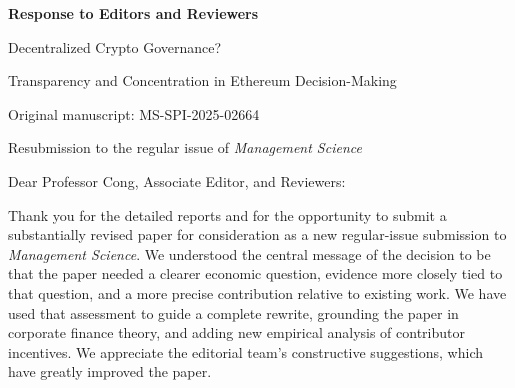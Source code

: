 \documentclass[11pt,letterpaper]{article}
\begin{document}
\begin{center}
{\Large\bfseries Response to Editors and Reviewers}\par
\vspace{5pt}
{\large Decentralized Crypto Governance?}\par
Transparency and Concentration in Ethereum Decision-Making\par
\vspace{4pt}
Original manuscript: MS-SPI-2025-02664\par
Resubmission to the regular issue of \textit{Management Science}\par
\end{center}

Dear Professor Cong, Associate Editor, and Reviewers:

Thank you for the detailed reports and for the opportunity to submit a substantially revised paper for consideration as a new regular-issue submission to \textit{Management Science}. We understood the central message of the decision to be that the paper needed a clearer economic question, evidence more closely tied to that question, and a more precise contribution relative to existing work. We have used that assessment to guide a complete rewrite, grounding the paper in corporate finance theory, and adding new empirical analysis of contributor incentives. We appreciate the editorial team’s constructive suggestions, which have greatly improved the paper.
\end{document}
